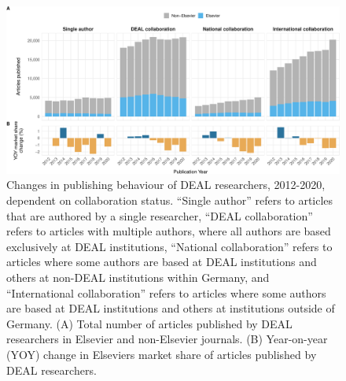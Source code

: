 \documentclass[
]{article}
\begin{document}
\begin{figure}

{\centering \includegraphics{analysis_files/figure-latex/items-publisher-year-collaboration-1} 

}

\caption{Changes in publishing behaviour of DEAL researchers, 2012-2020, dependent on collaboration status. ``Single author'' refers to articles that are authored by a single researcher, ``DEAL collaboration'' refers to articles with multiple authors, where all authors are based exclusively at DEAL institutions, ``National collaboration'' refers to articles where some authors are based at DEAL institutions and others at non-DEAL institutions within Germany, and ``International collaboration'' refers to articles where some authors are based at DEAL institutions and others at institutions outside of Germany. (A) Total number of articles published by DEAL researchers in Elsevier and non-Elsevier journals. (B) Year-on-year (YOY) change in Elsevier\textquotesingle s market share of articles published by DEAL researchers.}\label{fig:items-publisher-year-collaboration}
\end{figure}
\end{document}
